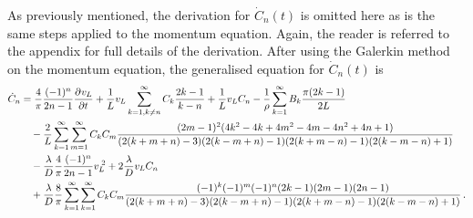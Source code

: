 
As previously mentioned, the derivation for $\dot{C}_n(t)$ is omitted here as is the same steps applied to the momentum equation. Again, the reader is referred to the appendix for full details of the derivation. After using the Galerkin method on the momentum equation, the generalised equation for $\dot{C}_n(t)$ is
~ 
\begin{equation*}
\begin{split}
    \dot{C}_n &=
    \frac{4}{\pi} \frac{(-1)^n}{2n-1} \pdiff{v_L}{t}
    + \frac{1}{L} v_L \sum^{\infty}_{k=1,k \neq n} C_k \frac{2k-1}{k-n}
    + \frac{1}{L} v_L C_n
    - \frac{1}{\rho} \sum^{\infty}_{k=1} B_k \frac{\pi (2k-1)}{2L}
    \\ & \quad %
    - \frac{2}{L} \sum^{\infty}_{k=1} \sum^{\infty}_{m=1} C_k C_m \frac{
    (2m-1)^2 (4k^2 - 4k + 4m^2 - 4m - 4n^2 + 4n + 1)
    }{
    (2(k+m+n)-3)(2(k-m+n)-1)(2(k+m-n)-1)(2(k-m-n)+1)
    }
    \\ & \quad %
    - \frac{\lambda}{D} \frac{4}{\pi} \frac{(-1)^n}{2n-1} v_L\power{2}
    + 2 \frac{\lambda}{D} v_L C_n
    \\ & \quad %
    + \frac{\lambda}{D} \frac{8}{\pi} \sum^{\infty}_{k=1} \sum^{\infty}_{k=1} C_k C_m \frac{
    (-1)^k (-1)^m (-1)^n (2k-1) (2m-1) (2n-1)
    }{
    (2(k+m+n)-3)(2(k-m+n)-1)(2(k+m-n)-1)(2(k-m-n)+1)
    } \, .
\end{split}
\end{equation*}

